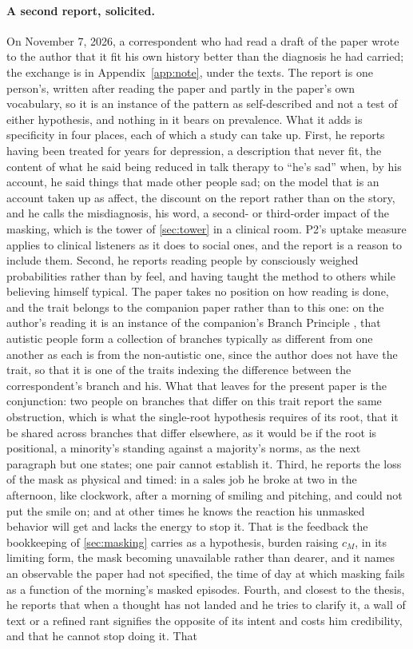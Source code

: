 \paragraph{A second report, solicited.} On November 7, 2026, a correspondent who had read a draft of the paper wrote to the author that it fit his own history better than the diagnosis he had carried; the exchange is in Appendix~\ref{app:note}, under the texts. The report is one person's, written after reading the paper and partly in the paper's own vocabulary, so it is an instance of the pattern as self-described and not a test of either hypothesis, and nothing in it bears on prevalence. What it adds is specificity in four places, each of which a study can take up. First, he reports having been treated for years for depression, a description that never fit, the content of what he said being reduced in talk therapy to ``he's sad'' when, by his account, he said things that made other people sad; on the model that is an account taken up as affect, the discount on the report rather than on the story, and he calls the misdiagnosis, his word, a second- or third-order impact of the masking, which is the tower of \autoref{sec:tower} in a clinical room. P2's uptake measure applies to clinical listeners as it does to social ones, and the report is a reason to include them. Second, he reports reading people by consciously weighed probabilities rather than by feel, and having taught the method to others while believing himself typical. The paper takes no position on how reading is done, and the trait belongs to the companion paper rather than to this one: on the author's reading it is an instance of the companion's Branch Principle \cite{NormCost}, that autistic people form a collection of branches typically as different from one another as each is from the non-autistic one, since the author does not have the trait, so that it is one of the traits indexing the difference between the correspondent's branch and his. What that leaves for the present paper is the conjunction: two people on branches that differ on this trait report the same obstruction, which is what the single-root hypothesis requires of its root, that it be shared across branches that differ elsewhere, as it would be if the root is positional, a minority's standing against a majority's norms, as the next paragraph but one states; one pair cannot establish it. Third, he reports the loss of the mask as physical and timed: in a sales job he broke at two in the afternoon, like clockwork, after a morning of smiling and pitching, and could not put the smile on; and at other times he knows the reaction his unmasked behavior will get and lacks the energy to stop it. That is the feedback the bookkeeping of \autoref{sec:masking} carries as a hypothesis, burden raising $c_M$, in its limiting form, the mask becoming unavailable rather than dearer, and it names an observable the paper had not specified, the time of day at which masking fails as a function of the morning's masked episodes. Fourth, and closest to the thesis, he reports that when a thought has not landed and he tries to clarify it, a wall of text or a refined rant signifies the opposite of its intent and costs him credibility, and that he cannot stop doing it. That 